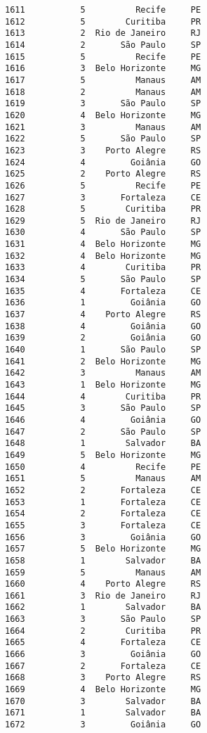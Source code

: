\documentclass[11pt]{article}
\begin{document}
\begin{Verbatim}[commandchars=\\\{\}]
1611           5          Recife     PE  
1612           5        Curitiba     PR  
1613           2  Rio de Janeiro     RJ  
1614           2       São Paulo     SP  
1615           5          Recife     PE  
1616           3  Belo Horizonte     MG  
1617           5          Manaus     AM  
1618           2          Manaus     AM  
1619           3       São Paulo     SP  
1620           4  Belo Horizonte     MG  
1621           3          Manaus     AM  
1622           5       São Paulo     SP  
1623           3    Porto Alegre     RS  
1624           4         Goiânia     GO  
1625           2    Porto Alegre     RS  
1626           5          Recife     PE  
1627           3       Fortaleza     CE  
1628           5        Curitiba     PR  
1629           5  Rio de Janeiro     RJ  
1630           4       São Paulo     SP  
1631           4  Belo Horizonte     MG  
1632           4  Belo Horizonte     MG  
1633           4        Curitiba     PR  
1634           5       São Paulo     SP  
1635           4       Fortaleza     CE  
1636           1         Goiânia     GO  
1637           4    Porto Alegre     RS  
1638           4         Goiânia     GO  
1639           2         Goiânia     GO  
1640           1       São Paulo     SP  
1641           2  Belo Horizonte     MG  
1642           3          Manaus     AM  
1643           1  Belo Horizonte     MG  
1644           4        Curitiba     PR  
1645           3       São Paulo     SP  
1646           4         Goiânia     GO  
1647           2       São Paulo     SP  
1648           1        Salvador     BA  
1649           5  Belo Horizonte     MG  
1650           4          Recife     PE  
1651           5          Manaus     AM  
1652           2       Fortaleza     CE  
1653           1       Fortaleza     CE  
1654           2       Fortaleza     CE  
1655           3       Fortaleza     CE  
1656           3         Goiânia     GO  
1657           5  Belo Horizonte     MG  
1658           1        Salvador     BA  
1659           5          Manaus     AM  
1660           4    Porto Alegre     RS  
1661           3  Rio de Janeiro     RJ  
1662           1        Salvador     BA  
1663           3       São Paulo     SP  
1664           2        Curitiba     PR  
1665           4       Fortaleza     CE  
1666           3         Goiânia     GO  
1667           2       Fortaleza     CE  
1668           3    Porto Alegre     RS  
1669           4  Belo Horizonte     MG  
1670           3        Salvador     BA  
1671           1        Salvador     BA  
1672           3         Goiânia     GO  

\end{Verbatim}
\end{document}
